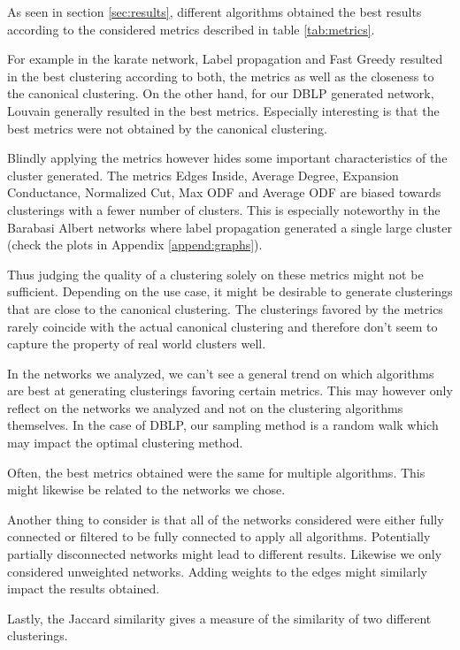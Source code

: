 

As seen in section \ref{sec:results}, different algorithms obtained the best results according to the considered metrics described in table \ref{tab:metrics}.

For example in the karate network, Label propagation and Fast Greedy resulted in the best clustering according to both, the metrics as well as the closeness to the canonical clustering. On the other hand, for our DBLP generated network, Louvain generally resulted in the best metrics. Especially interesting is that the best metrics were not obtained by the canonical clustering. 

Blindly applying the metrics however hides some important characteristics of the cluster generated. The metrics Edges Inside, Average Degree, Expansion Conductance, Normalized Cut, Max ODF and Average ODF are biased towards clusterings with a fewer number of clusters. This is especially noteworthy in the Barabasi Albert networks where label propagation generated a single large cluster (check the plots in Appendix \ref{append:graphs}).

Thus judging the quality of a clustering solely on these metrics might not be sufficient. Depending on the use case, it might be desirable to generate clusterings that are close to the canonical clustering. The clusterings favored by the metrics rarely coincide with the actual canonical clustering and therefore don't seem to capture the property of real world clusters well.

In the networks we analyzed, we can't see a general trend on which algorithms are best at generating clusterings favoring certain metrics. This may however only reflect on the networks we analyzed and not on the clustering algorithms themselves. In the case of DBLP, our sampling method is a random walk which may impact the optimal clustering method.

Often, the best metrics obtained were the same for multiple algorithms. This might likewise be related to the networks we chose.

Another thing to consider is that all of the networks considered were either fully connected or filtered to be fully connected to apply all algorithms. %
Potentially partially disconnected networks might lead to different results. Likewise we only considered unweighted networks. Adding weights to the edges might similarly impact the results obtained.

Lastly, the Jaccard similarity gives a measure of the similarity of two different clusterings.

